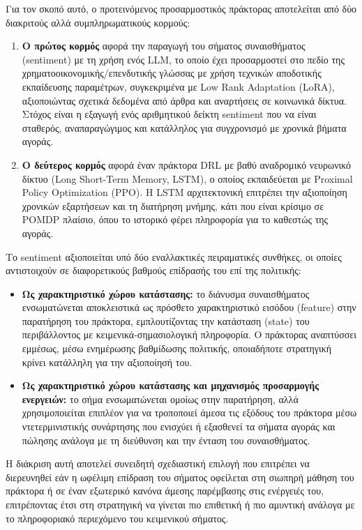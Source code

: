 Για τον σκοπό αυτό, ο προτεινόμενος προσαρμοστικός πράκτορας αποτελείται από 
δύο διακριτούς αλλά συμπληρωματικούς κορμούς:
\begin{enumerate}
    \item \textbf{Ο πρώτος κορμός} αφορά την παραγωγή του σήματος συναισθήματος (sentiment) με τη χρήση 
    ενός LLM, το οποίο έχει προσαρμοστεί στο πεδίο της χρηματοοικονομικής/επενδυτικής 
    γλώσσας με χρήση τεχνικών αποδοτικής εκπαίδευσης παραμέτρων, συγκεκριμένα 
    με Low Rank Adaptation (LoRA), αξιοποιώντας σχετικά δεδομένα από άρθρα 
    και αναρτήσεις σε κοινωνικά δίκτυα. Στόχος είναι η εξαγωγή ενός 
    αριθμητικού δείκτη sentiment που να είναι σταθερός, αναπαραγώγιμος και 
    κατάλληλος για συγχρονισμό με χρονικά βήματα αγοράς.
    \item \textbf{Ο δεύτερος κορμός} αφορά έναν πράκτορα DRL με βαθύ αναδρομικό νευρωνικό δίκτυο (Long Short-Term Memory, LSTM), 
    ο οποίος εκπαιδεύεται με Proximal Policy Optimization (PPO). Η LSTM αρχιτεκτονική 
    επιτρέπει την αξιοποίηση χρονικών εξαρτήσεων και τη διατήρηση μνήμης, κάτι που είναι 
    κρίσιμο σε POMDP πλαίσιο, όπου το ιστορικό φέρει πληροφορία για το καθεστώς της αγοράς.
\end{enumerate}

Το sentiment αξιοποιείται υπό δύο εναλλακτικές πειραματικές συνθήκες, οι οποίες
αντιστοιχούν σε διαφορετικούς βαθμούς επίδρασής του επί της πολιτικής:
\begin{itemize}
    \item[(α)] \textbf{Ως χαρακτηριστικό χώρου κατάστασης:} το διάνυσμα
    συναισθήματος ενσωματώνεται αποκλειστικά ως πρόσθετο χαρακτηριστικό εισόδου
    (feature) στην παρατήρηση του πράκτορα, εμπλουτίζοντας την κατάσταση
    (state) του περιβάλλοντος με κειμενικά-σημασιολογική πληροφορία. Ο πράκτορας
    αναπτύσσει εμμέσως, μέσω ενημέρωσης βαθμίδωσης πολιτικής, οποιαδήποτε
    στρατηγική κρίνει κατάλληλη για την αξιοποίησή του.
    \item[(β)] \textbf{Ως χαρακτηριστικό χώρου κατάστασης και μηχανισμός
    προσαρμογής ενεργειών:} το σήμα ενσωματώνεται ομοίως στην παρατήρηση, αλλά
    χρησιμοποιείται επιπλέον για να τροποποιεί άμεσα τις εξόδους του πράκτορα
    μέσω ντετερμινιστικής συνάρτησης που ενισχύει ή εξασθενεί τα σήματα αγοράς
    και πώλησης ανάλογα με τη διεύθυνση και την ένταση του συναισθήματος.
\end{itemize}
Η διάκριση αυτή αποτελεί συνειδητή σχεδιαστική επιλογή που επιτρέπει να
διερευνηθεί εάν η ωφέλιμη επίδραση του σήματος οφείλεται στη σιωπηρή μάθηση
του πράκτορα ή σε έναν εξωτερικό κανόνα άμεσης παρέμβασης στις ενέργειές του,
επιτρέποντας έτσι στη στρατηγική να γίνεται πιο επιθετική ή πιο αμυντική
ανάλογα με το πληροφοριακό περιεχόμενο του κειμενικού σήματος.

